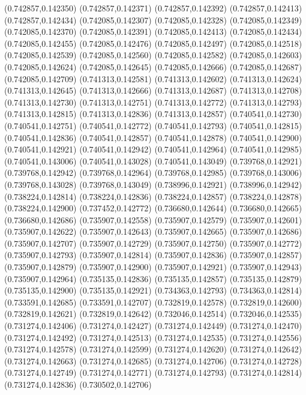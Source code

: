 (0.742857,0.142350)
(0.742857,0.142371)
(0.742857,0.142392)
(0.742857,0.142413)
(0.742857,0.142434)
(0.742085,0.142307)
(0.742085,0.142328)
(0.742085,0.142349)
(0.742085,0.142370)
(0.742085,0.142391)
(0.742085,0.142413)
(0.742085,0.142434)
(0.742085,0.142455)
(0.742085,0.142476)
(0.742085,0.142497)
(0.742085,0.142518)
(0.742085,0.142539)
(0.742085,0.142560)
(0.742085,0.142582)
(0.742085,0.142603)
(0.742085,0.142624)
(0.742085,0.142645)
(0.742085,0.142666)
(0.742085,0.142687)
(0.742085,0.142709)
(0.741313,0.142581)
(0.741313,0.142602)
(0.741313,0.142624)
(0.741313,0.142645)
(0.741313,0.142666)
(0.741313,0.142687)
(0.741313,0.142708)
(0.741313,0.142730)
(0.741313,0.142751)
(0.741313,0.142772)
(0.741313,0.142793)
(0.741313,0.142815)
(0.741313,0.142836)
(0.741313,0.142857)
(0.740541,0.142730)
(0.740541,0.142751)
(0.740541,0.142772)
(0.740541,0.142793)
(0.740541,0.142815)
(0.740541,0.142836)
(0.740541,0.142857)
(0.740541,0.142878)
(0.740541,0.142900)
(0.740541,0.142921)
(0.740541,0.142942)
(0.740541,0.142964)
(0.740541,0.142985)
(0.740541,0.143006)
(0.740541,0.143028)
(0.740541,0.143049)
(0.739768,0.142921)
(0.739768,0.142942)
(0.739768,0.142964)
(0.739768,0.142985)
(0.739768,0.143006)
(0.739768,0.143028)
(0.739768,0.143049)
(0.738996,0.142921)
(0.738996,0.142942)
(0.738224,0.142814)
(0.738224,0.142836)
(0.738224,0.142857)
(0.738224,0.142878)
(0.738224,0.142900)
(0.737452,0.142772)
(0.736680,0.142644)
(0.736680,0.142665)
(0.736680,0.142686)
(0.735907,0.142558)
(0.735907,0.142579)
(0.735907,0.142601)
(0.735907,0.142622)
(0.735907,0.142643)
(0.735907,0.142665)
(0.735907,0.142686)
(0.735907,0.142707)
(0.735907,0.142729)
(0.735907,0.142750)
(0.735907,0.142772)
(0.735907,0.142793)
(0.735907,0.142814)
(0.735907,0.142836)
(0.735907,0.142857)
(0.735907,0.142879)
(0.735907,0.142900)
(0.735907,0.142921)
(0.735907,0.142943)
(0.735907,0.142964)
(0.735135,0.142836)
(0.735135,0.142857)
(0.735135,0.142879)
(0.735135,0.142900)
(0.735135,0.142921)
(0.734363,0.142793)
(0.734363,0.142814)
(0.733591,0.142685)
(0.733591,0.142707)
(0.732819,0.142578)
(0.732819,0.142600)
(0.732819,0.142621)
(0.732819,0.142642)
(0.732046,0.142514)
(0.732046,0.142535)
(0.731274,0.142406)
(0.731274,0.142427)
(0.731274,0.142449)
(0.731274,0.142470)
(0.731274,0.142492)
(0.731274,0.142513)
(0.731274,0.142535)
(0.731274,0.142556)
(0.731274,0.142578)
(0.731274,0.142599)
(0.731274,0.142620)
(0.731274,0.142642)
(0.731274,0.142663)
(0.731274,0.142685)
(0.731274,0.142706)
(0.731274,0.142728)
(0.731274,0.142749)
(0.731274,0.142771)
(0.731274,0.142793)
(0.731274,0.142814)
(0.731274,0.142836)
(0.730502,0.142706)

